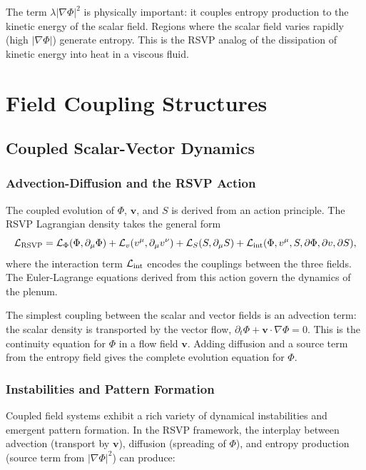 \documentclass[12pt,a4paper,oneside]{book}
\theoremstyle{definition}
\theoremstyle{plain}
\theoremstyle{remark}
\begin{document}
The term $\lambda|\nabla\Phi|^2$ is physically important: it couples entropy
production to the kinetic energy of the scalar field. Regions where the scalar
field varies rapidly (high $|\nabla\Phi|$) generate entropy. This is the RSVP
analog of the dissipation of kinetic energy into heat in a viscous fluid.

\part{Field Coupling Structures}

\chapter{Coupled Scalar-Vector Dynamics}

\section{Advection-Diffusion and the RSVP Action}

The coupled evolution of $\Phi$, $\mathbf{v}$, and $S$ is derived from an
action principle. The RSVP Lagrangian density takes the general form
\begin{equation}
\mathcal{L}_{\rm RSVP}
= \mathcal{L}_\Phi(\Phi, \partial_\mu\Phi)
+ \mathcal{L}_v(v^\mu, \partial_\mu v^\nu)
+ \mathcal{L}_S(S, \partial_\mu S)
+ \mathcal{L}_{\rm int}(\Phi, v^\mu, S, \partial\Phi, \partial v, \partial S),
\end{equation}
where the interaction term $\mathcal{L}_{\rm int}$ encodes the couplings
between the three fields. The Euler-Lagrange equations derived from this
action govern the dynamics of the plenum.

The simplest coupling between the scalar and vector fields is an
advection term: the scalar density is transported by the vector flow,
$\partial_t\Phi + \mathbf{v}\cdot\nabla\Phi = 0$. This is the continuity
equation for $\Phi$ in a flow field $\mathbf{v}$. Adding diffusion and a
source term from the entropy field gives the complete evolution equation for
$\Phi$.

\section{Instabilities and Pattern Formation}

Coupled field systems exhibit a rich variety of dynamical instabilities and
emergent pattern formation. In the RSVP framework, the interplay between
advection (transport by $\mathbf{v}$), diffusion (spreading of $\Phi$), and
entropy production (source term from $|\nabla\Phi|^2$) can produce:
\end{document}

